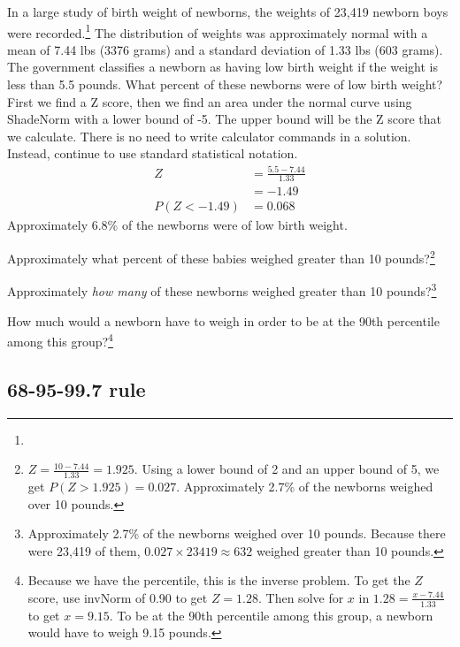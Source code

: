 \begin{example}{In a large study of birth weight of newborns, the weights of 23,419 newborn boys were recorded.\footnote{} The distribution of weights was approximately normal with a mean of 7.44 lbs (3376 grams) and a standard deviation of 1.33 lbs (603 grams). The government classifies a newborn as having low birth weight if the weight is less than 5.5 pounds. What percent of these newborns were of low birth weight?}
First we find a Z score, then we find an area under the normal curve using ShadeNorm with a lower bound of -5. The upper bound will be the Z score that we calculate. There is no need to write calculator commands in a solution. Instead, continue to use standard statistical notation. 
\begin{align*}
Z&=\frac{5.5-7.44}{1.33}\\
&=-1.49\\
P(Z < -1.49) &= 0.068
\end{align*}
Approximately 6.8\% of the newborns were of low birth weight.
\end{example}

\begin{exercise}Approximately what percent of these babies weighed greater than 10 pounds?\footnote{$Z=\frac{10-7.44}{1.33}=1.925$. Using a lower bound of 2 and an upper bound of 5, we get $P(Z > 1.925) = 0.027$. Approximately 2.7\% of the newborns weighed over 10 pounds.}
\end{exercise}

\begin{exercise}Approximately \emph{how many} of these newborns weighed greater than 10 pounds?\footnote{Approximately 2.7\% of the newborns weighed over 10 pounds. Because there were 23,419 of them, $0.027 \times 23419 \approx 632$ weighed greater than 10 pounds.}
\end{exercise}

\begin{exercise}How much would a newborn have to weigh in order to be at the 90th percentile among this group?\footnote{Because we have the percentile, this is the inverse problem. To get the $Z$ score, use invNorm of 0.90 to get $Z =  1.28$. Then solve for $x$ in $1.28=\frac{x - 7.44}{1.33}$ to get $x = 9.15$. To be at the 90th percentile among this group, a newborn would have to weigh 9.15 pounds.}
\end{exercise}


\subsection{68-95-99.7 rule}

